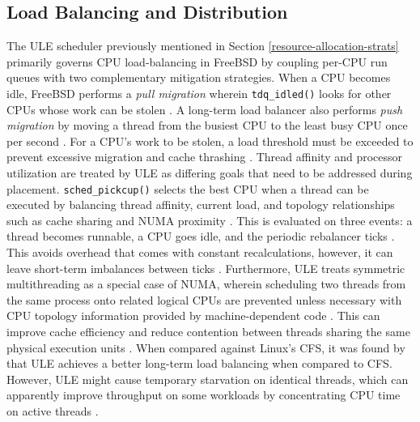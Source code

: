 \subsection{Load Balancing and Distribution} \label{load-balancing-distribution} %

The ULE scheduler previously mentioned in Section \ref{resource-allocation-strats} primarily governs CPU load-balancing in FreeBSD by coupling per-CPU
run queues with two complementary mitigation strategies. When a CPU becomes idle, FreeBSD performs a \textit{pull migration} wherein
\texttt{tdq\_idled()} looks for other CPUs whose work can be stolen \parencite{mckusick2014_process}. A long-term load balancer also performs
\textit{push migration} by moving a thread from the busiest CPU to the least busy CPU once per second
\parencites{mckusick2014_process}{mckusick2020}. For a CPU's work to be stolen, a load threshold must be exceeded to
prevent excessive migration and cache thrashing \parencite{mckusick2020}. Thread affinity and processor utilization
are treated by ULE as differing goals that need to be addressed during placement. \texttt{sched\_pickcup()} selects the best CPU when a
thread can be executed by balancing thread affinity, current load, and topology relationships such as cache sharing and NUMA proximity
\parencite{roberson_ule}. This is evaluated on three events: a thread becomes runnable, a CPU goes idle, and the periodic rebalancer
ticks \parencite{mckusick2014_process}. This avoids overhead that comes with constant recalculations, however, it can leave short-term
imbalances between ticks \parencite{mckusick2014_process}. Furthermore, ULE treats symmetric multithreading as a special case of NUMA,
wherein scheduling two threads from the same process onto related logical CPUs are prevented unless necessary with CPU topology information
provided by machine-dependent code \parencite{roberson_ule}. This can improve cache efficiency and reduce contention between threads sharing
the same physical execution units \parencite{roberson_ule}. When compared against Linux's CFS, it was found by \textcite{bouron2018}
that ULE achieves a better long-term load balancing when compared to CFS. However, ULE might cause temporary starvation on identical threads,
which can apparently improve throughput on some workloads by concentrating CPU time on active threads \parencite{bouron2018}.

